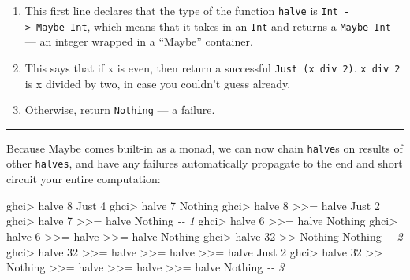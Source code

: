 \documentclass[]{article}
\newenvironment{Shaded}{}{}
\newcommand{\CommentTok}[1]{\textcolor[rgb]{0.38,0.63,0.69}{\textit{#1}}}
\newcommand{\DataTypeTok}[1]{\textcolor[rgb]{0.56,0.13,0.00}{#1}}
\newcommand{\DecValTok}[1]{\textcolor[rgb]{0.25,0.63,0.44}{#1}}
\newcommand{\NormalTok}[1]{#1}
\newcommand{\OperatorTok}[1]{\textcolor[rgb]{0.40,0.40,0.40}{#1}}
\begin{document}
\begin{enumerate}
\def\labelenumi{\arabic{enumi}.}
\tightlist
\item
  This first line declares that the type of the function \texttt{halve} is
  \texttt{Int\ -\textgreater{}\ Maybe\ Int}, which means that it takes in an
  \texttt{Int} and returns a \texttt{Maybe\ Int} --- an integer wrapped in a
  ``Maybe'' container.
\item
  This says that if x is even, then return a successful
  \texttt{Just\ (x\ \textasciigrave{}div\textasciigrave{}\ 2)}.
  \texttt{x\ \textasciigrave{}div\textasciigrave{}\ 2} is x divided by two, in
  case you couldn't guess already.
\item
  Otherwise, return \texttt{Nothing} --- a failure.
\end{enumerate}

\begin{center}\rule{0.5\linewidth}{\linethickness}\end{center}

Because Maybe comes built-in as a monad, we can now chain \texttt{halve}s on
results of other \texttt{halves}, and have any failures automatically propagate
to the end and short circuit your entire computation:

\begin{Shaded}
\begin{Highlighting}[]
\NormalTok{ghci}\OperatorTok{>}\NormalTok{ halve }\DecValTok{8}
\DataTypeTok{Just} \DecValTok{4}
\NormalTok{ghci}\OperatorTok{>}\NormalTok{ halve }\DecValTok{7}
\DataTypeTok{Nothing}
\NormalTok{ghci}\OperatorTok{>}\NormalTok{ halve }\DecValTok{8} \OperatorTok{>>=}\NormalTok{ halve}
\DataTypeTok{Just} \DecValTok{2}
\NormalTok{ghci}\OperatorTok{>}\NormalTok{ halve }\DecValTok{7} \OperatorTok{>>=}\NormalTok{ halve}
\DataTypeTok{Nothing}                         \CommentTok{{-}{-} 1}
\NormalTok{ghci}\OperatorTok{>}\NormalTok{ halve }\DecValTok{6} \OperatorTok{>>=}\NormalTok{ halve}
\DataTypeTok{Nothing}
\NormalTok{ghci}\OperatorTok{>}\NormalTok{ halve }\DecValTok{6} \OperatorTok{>>=}\NormalTok{ halve }\OperatorTok{>>=}\NormalTok{ halve}
\DataTypeTok{Nothing}
\NormalTok{ghci}\OperatorTok{>}\NormalTok{ halve }\DecValTok{32} \OperatorTok{>>} \DataTypeTok{Nothing}
\DataTypeTok{Nothing}                         \CommentTok{{-}{-} 2}
\NormalTok{ghci}\OperatorTok{>}\NormalTok{ halve }\DecValTok{32} \OperatorTok{>>=}\NormalTok{ halve }\OperatorTok{>>=}\NormalTok{ halve }\OperatorTok{>>=}\NormalTok{ halve}
\DataTypeTok{Just} \DecValTok{2}
\NormalTok{ghci}\OperatorTok{>}\NormalTok{ halve }\DecValTok{32} \OperatorTok{>>} \DataTypeTok{Nothing} \OperatorTok{>>=}\NormalTok{ halve }\OperatorTok{>>=}\NormalTok{ halve }\OperatorTok{>>=}\NormalTok{ halve}
\DataTypeTok{Nothing}                         \CommentTok{{-}{-} 3}
\end{Highlighting}
\end{Shaded}
\end{document}
